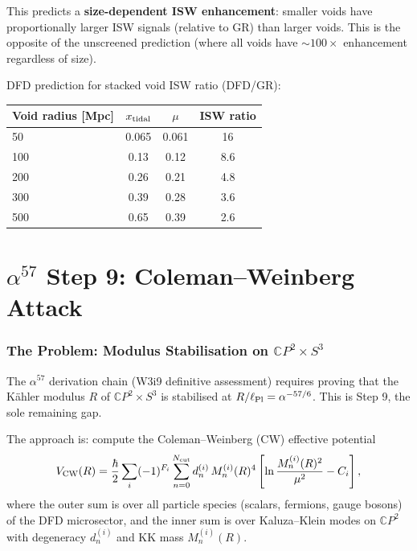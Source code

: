 \documentclass[11pt,a4paper]{article}
\newcommand{\mufd}{\mu}
\newcommand{\CP}{\mathbb{C}P}
\newcommand{\alphafine}{\alpha}
\begin{document}
This predicts a \textbf{size-dependent ISW enhancement}: smaller
voids have proportionally larger ISW signals (relative to GR) than
larger voids. This is the opposite of the unscreened prediction
(where all voids have $\sim 100\times$ enhancement regardless of
size).

DFD prediction for stacked void ISW ratio (DFD/GR):
\begin{center}
\begin{tabular}{lccc}
\toprule
Void radius [Mpc] & $x_{\rm tidal}$ & $\mufd$ & ISW ratio \\
\midrule
50 & 0.065 & 0.061 & 16 \\
100 & 0.13 & 0.12 & 8.6 \\
200 & 0.26 & 0.21 & 4.8 \\
300 & 0.39 & 0.28 & 3.6 \\
500 & 0.65 & 0.39 & 2.6 \\
\bottomrule
\end{tabular}
\end{center}


\part{$\alpha^{57}$ Step 9: Coleman--Weinberg Attack}
\label{part:alpha57}

\section{The Problem: Modulus Stabilisation on $\CP^2 \times S^3$}
\label{sec:modulus-problem}

The $\alpha^{57}$ derivation chain (W3i9 definitive assessment)
requires proving that the K\"ahler modulus $R$ of $\CP^2 \times S^3$
is stabilised at $R/\ell_{\rm Pl} = \alphafine^{-57/6}$. This is
Step 9, the sole remaining gap.

The approach is: compute the Coleman--Weinberg (CW) effective potential
\begin{equation}
V_{\rm CW}(R) = \frac{\hbar}{2}\sum_i (-1)^{F_i}
\sum_{n=0}^{N_{\rm cut}} d_n^{(i)}\,M_n^{(i)}(R)^4
\left[\ln\frac{M_n^{(i)}(R)^2}{\mu^2} - C_i\right],
\label{eq:CW-general}
\end{equation}
where the outer sum is over all particle species (scalars, fermions,
gauge bosons) of the DFD microsector, and the inner sum is over
Kaluza--Klein modes on $\CP^2$ with degeneracy $d_n^{(i)}$ and
KK mass $M_n^{(i)}(R)$.
\end{document}
